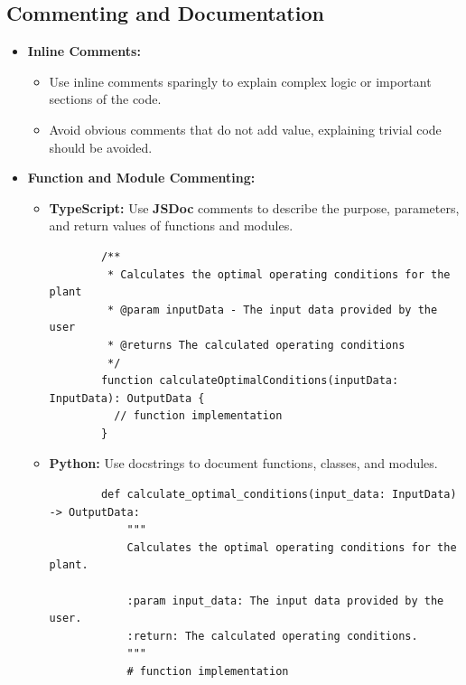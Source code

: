 \documentclass{article}
\begin{document}
\subsection{Commenting and Documentation}

\begin{itemize}
    \item \textbf{Inline Comments:}
    \begin{itemize}
        \item Use inline comments sparingly to explain complex logic or important sections of the code.
        \item Avoid obvious comments that do not add value, explaining trivial code should be avoided.
    \end{itemize}
    
    \item \textbf{Function and Module Commenting:}
    \begin{itemize}
        \item \textbf{TypeScript:} Use \textbf{JSDoc} comments to describe the purpose, parameters, and return values of functions and modules.
        \begin{verbatim}
        /**
         * Calculates the optimal operating conditions for the plant
         * @param inputData - The input data provided by the user
         * @returns The calculated operating conditions
         */
        function calculateOptimalConditions(inputData: InputData): OutputData {
          // function implementation
        }
        \end{verbatim}
        
        \item \textbf{Python:} Use docstrings to document functions, classes, and modules.
        \begin{verbatim}
        def calculate_optimal_conditions(input_data: InputData) -> OutputData:
            """
            Calculates the optimal operating conditions for the plant.

            :param input_data: The input data provided by the user.
            :return: The calculated operating conditions.
            """
            # function implementation
        \end{verbatim}
    \end{itemize}
\end{itemize}
\end{document}
